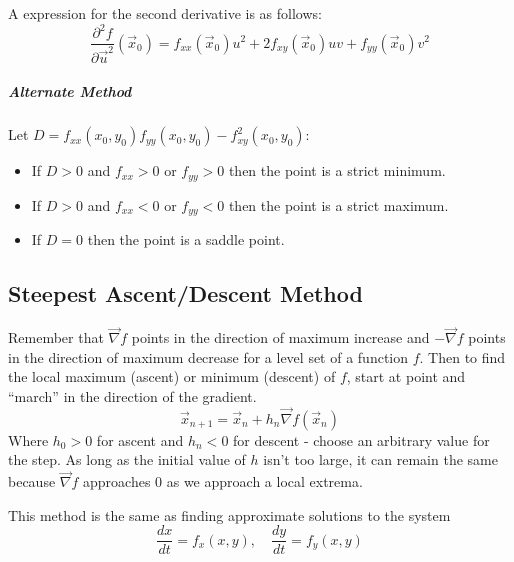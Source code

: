 \documentclass[11pt]{article}
\begin{document}
		A expression for the second derivative is as follows:
		\begin{equation}
			\frac{\partial^2 f}{\partial \vec{u}^2}(\vec{x}_0) = f_{xx}(\vec{x}_0)u^2 + 2f_{xy}(\vec{x}_0)uv + f_{yy}(\vec{x}_0)v^2
		\end{equation}
		
	\subparagraph{Alternate Method} Let $D = f_{xx}(x_0, y_0)f_{yy}(x_0, y_0) - f_{xy}^2 (x_0, y_0)$:
		\begin{itemize}
			\item If $D > 0$ and $f_{xx} > 0$ or $f_{yy} > 0$ then the point is a strict minimum.
			\item If $D > 0$ and $f_{xx} < 0$ or $f_{yy} < 0$ then the point is a strict maximum.
			\item If $D = 0$ then the point is a saddle point.
		\end{itemize}
		
	\subsection{Steepest Ascent/Descent Method}
		Remember that $\vec{\nabla} f$ points in the direction of maximum increase and $-\vec{\nabla} f$ points in the direction of maximum decrease for a level set of a function $f$. Then to find the local maximum (ascent) or minimum (descent) of $f$, start at point and ``march'' in the direction of the gradient.
		\begin{equation}
			\vec{x}_{n+1} = \vec{x}_n + h_n \vec{\nabla} f(\vec{x}_n)
		\end{equation}
		Where $h_0 > 0$ for ascent and $h_n < 0$ for descent - choose an arbitrary value for the step. As long as the initial value of $h$ isn't too large, it can remain the same because $\vec{\nabla} f$ approaches 0 as we approach a local extrema.
		
		This method is the same as finding approximate solutions to the system
		\begin{equation}
			\frac{dx}{dt} = f_x(x, y), \quad \frac{dy}{dt} = f_y(x, y)
		\end{equation}
		
		
%		
%		


\end{document}
